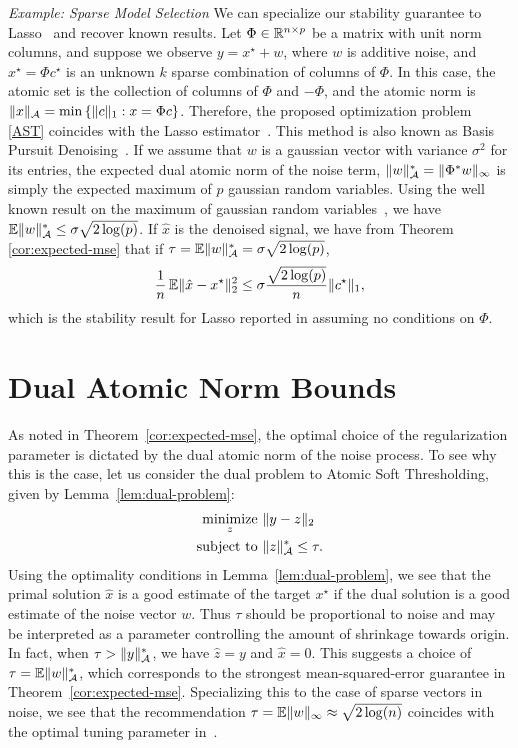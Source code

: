 \noindent\emph{Example: Sparse Model Selection} We can specialize our stability
guarantee to Lasso~\cite{tibshirani96} and recover known results. Let $\Phi \in
\mathbb{R}^{n \times p}$ be a matrix with unit norm columns, and suppose we observe $y =
x^\star + w$, where $w$ is additive noise, and $x^\star = \Phi c^\star$ is an
unknown $k$ sparse combination of columns of $\Phi$. In this case, the atomic
set is the collection of columns of $\Phi$ and $-\Phi$, and the atomic norm is
$\lVert x\rVert_{\mathcal{A}} = \min \left\{\lVert c\rVert_1: x = \Phi c\right\}$. Therefore, the
proposed optimization problem \eqref{AST} coincides with the Lasso
estimator~\cite{tibshirani96}. This method is also known as Basis Pursuit
Denoising~\cite{chen98}. If we assume that $w$ is a gaussian vector with
variance $\sigma^2$ for its entries, the expected dual atomic norm of the noise
term, $\lVert w\rVert_{\mathcal{A}}^* = \lVert\Phi^*w\rVert_\infty$ is simply the expected maximum
of $p$ gaussian random variables. Using the well known result on the maximum of
gaussian random variables~\cite{lr76}, we have $\operatorname{\mathbb{E}}\lVert w\rVert_{\mathcal{A}}^* \leq \sigma
\sqrt{2 \log(p)}$. If $\hat{x}$ is the denoised signal, we have from Theorem
\ref{cor:expected-mse} that if $\tau = \operatorname{\mathbb{E}}\lVert w\rVert_{\mathcal{A}}^* = \sigma \sqrt{2
\log(p)}$, \[ \frac{1}{n}\operatorname{\mathbb{E}}\lVert\hat{x} - x^\star\rVert_2^2 \leq \sigma
\frac{\sqrt{2\log(p)} }{n} \lVert c^\star\rVert_1, \] which is the stability result
for Lasso reported in \cite{greenshtein04} assuming no conditions on $\Phi$.

\section{Dual Atomic Norm Bounds} %
\label{sec:dual-atomic-bounds}
As noted in Theorem~\ref{cor:expected-mse}, the optimal choice of the
regularization parameter is dictated by the dual atomic norm of the noise
process. To see why this is the case, let us consider the dual problem to Atomic
Soft Thresholding, given by Lemma~\ref{lem:dual-problem}:
\begin{equation*}
  \begin{split} \mathop{\operatorname{minimize}}_z~&\lVert y - z\rVert_2\\
	 \text{subject to }&\lVert z\rVert_{\mathcal{A}}^* \leq \tau.
  \end{split}
\end{equation*} 
Using the optimality conditions in Lemma~\ref{lem:dual-problem}, we see that the
primal solution $\hat{x}$ is a good estimate of the target $x^\star$ if the dual
solution is a good estimate of the noise vector $w$. Thus $\tau$ should be
proportional to noise and may be interpreted as a parameter controlling the
amount of shrinkage towards origin. In fact, when $\tau > \lVert y\rVert_{\mathcal{A}}^*$, we
have $\hat{z} = y$ and $\hat{x} = 0.$ This suggests a choice of $\tau = \operatorname{\mathbb{E}}
\lVert w\rVert_{\mathcal{A}}^*$, which corresponds to the strongest mean-squared-error guarantee
in Theorem~\ref{cor:expected-mse}. Specializing this to the case of sparse
vectors in noise, we see that the recommendation $\tau = \operatorname{\mathbb{E}} \lVert w\rVert_\infty
\approx \sqrt{2 \log(n)}$ coincides with the optimal tuning parameter
in~\cite{donoho1995noising}.

